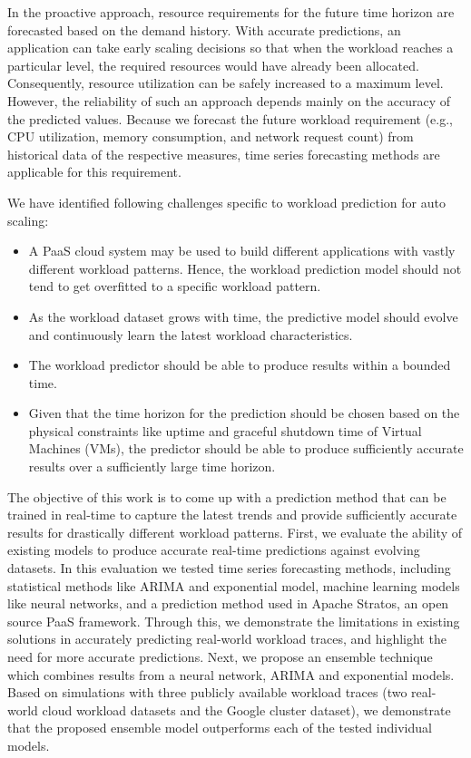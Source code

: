 In the proactive approach, resource requirements for the future time horizon are forecasted based on the demand history. With accurate predictions, an application can take early scaling decisions so that when the workload reaches a particular level, the required resources would have already been allocated. Consequently, resource utilization can be safely increased to a maximum level. However, the reliability of such an approach depends mainly on the accuracy of the predicted values. Because we forecast the future workload requirement (e.g., CPU utilization, memory consumption, and network request count) from historical data of the respective measures, time series forecasting methods are applicable for this requirement.

We have identified following challenges specific to workload prediction for auto scaling:
\begin{itemize}
\item A PaaS cloud system may be used to build different applications with vastly different workload patterns. Hence, the workload prediction model should not tend to get overfitted to a specific workload pattern.
\item As the workload dataset grows with time, the predictive model should evolve and continuously learn the latest workload characteristics.
\item The workload predictor should be able to produce results within a bounded time.
\item Given that the time horizon for the prediction should be chosen based on the physical constraints like uptime and graceful shutdown time of Virtual Machines (VMs), the predictor should be able to produce sufficiently accurate results over a sufficiently large time horizon.
\end{itemize}

The objective of this work is to come up with a prediction method that can be trained in real-time to capture the latest trends and provide sufficiently accurate results for drastically different workload patterns. First, we evaluate the ability of existing models to produce accurate real-time predictions against evolving datasets. In this evaluation we tested time series forecasting methods, including statistical methods like ARIMA and exponential model, machine learning models like neural networks, and a prediction method used in Apache Stratos, an open source PaaS framework. Through this, we demonstrate the limitations in existing solutions in accurately predicting real-world workload traces, and highlight the need for more accurate predictions. Next, we propose an ensemble technique which combines results from a neural network, ARIMA and exponential models. Based on simulations with three publicly available workload traces (two real-world cloud workload datasets and the Google cluster dataset), we demonstrate that the proposed ensemble model outperforms each of the tested individual models.

